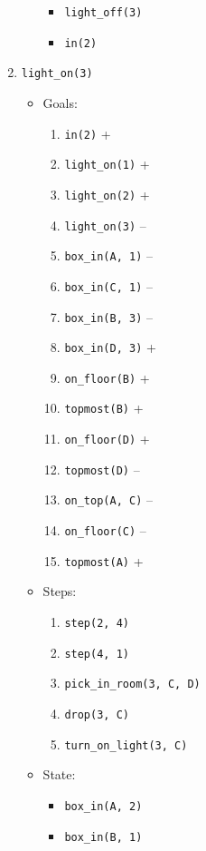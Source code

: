 \documentclass[12pt]{article}
\begin{document}
\begin{enumerate}
\begin{itemize}
\begin{itemize}
          \item \texttt{light\_off(3)}
          \item \texttt{in(2)}
        \end{itemize}
    \end{itemize}
  \item \texttt{light\_on(3)}
    \begin{itemize}
      \item Goals:
        \begin{enumerate}
          \item \texttt{in(2)} +
          \item \texttt{light\_on(1)} +
          \item \texttt{light\_on(2)} +
          \item \texttt{light\_on(3)} --
          \item \texttt{box\_in(A, 1)} --
          \item \texttt{box\_in(C, 1)} --
          \item \texttt{box\_in(B, 3)} --
          \item \texttt{box\_in(D, 3)} +
          \item \texttt{on\_floor(B)} +
          \item \texttt{topmost(B)} +
          \item \texttt{on\_floor(D)} +
          \item \texttt{topmost(D)} --
          \item \texttt{on\_top(A, C)} --
          \item \texttt{on\_floor(C)} --
          \item \texttt{topmost(A)} +
        \end{enumerate}
      \item Steps:
        \begin{enumerate}
          \item \texttt{step(2, 4)}
          \item \texttt{step(4, 1)}
          \item \texttt{pick\_in\_room(3, C, D)}
          \item \texttt{drop(3, C)}
          \item \texttt{turn\_on\_light(3, C)}
        \end{enumerate}
      \item State:
        \begin{itemize}
          \item \texttt{box\_in(A, 2)}
          \item \texttt{box\_in(B, 1)}

\end{itemize}
\end{itemize}
\end{enumerate}
\end{document}

